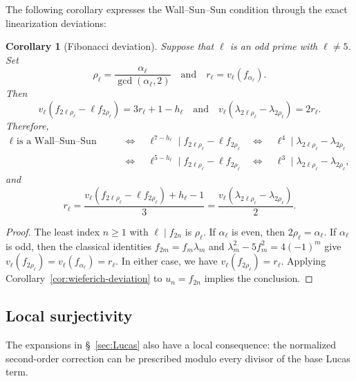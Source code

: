 \documentclass[12pt]{amsart}
\numberwithin{equation}{section}
\newtheorem{corollary}[theorem]{Corollary}
\theoremstyle{remark}
\theoremstyle{plain}
\begin{document}
The following corollary expresses the Wall--Sun--Sun condition through the exact linearization deviations:
\begin{corollary}[Fibonacci deviation]\label{cor:fib-deviation}
	Suppose that $\ell$ is an odd prime with $\ell\neq5$. Set
	\[
	\rho_\ell=\frac{\alpha_\ell}{\gcd(\alpha_\ell,2)}\quad\text{and}\quad r_\ell=v_\ell(f_{\alpha_\ell}).
	\]
	Then
	\[
	v_\ell\left(f_{2\ell\rho_\ell}-\ell f_{2\rho_\ell}\right)=3r_\ell+1-h_\ell\quad\text{and}\quad v_\ell\left(\lambda_{2\ell\rho_\ell}-\lambda_{2\rho_\ell}\right)=2r_\ell.
	\]
	Therefore,
	\[
	\begin{aligned}
		\ell\text{ is a Wall--Sun--Sun prime}\quad&\Longleftrightarrow\quad\ell^{7-h_\ell}\mid f_{2\ell\rho_\ell}-\ell f_{2\rho_\ell}\quad\Longleftrightarrow\quad \ell^4\mid\lambda_{2\ell\rho_\ell}-\lambda_{2\rho_\ell}\\
		&\Longleftrightarrow\quad\ell^{5-h_\ell}\mid f_{2\ell\rho_\ell}-\ell f_{2\rho_\ell}\quad\Longleftrightarrow\quad \ell^3\mid\lambda_{2\ell\rho_\ell}-\lambda_{2\rho_\ell},
	\end{aligned}
	\]
	and
	\[
	r_\ell=\frac{v_\ell(f_{2\ell\rho_\ell}-\ell f_{2\rho_\ell})+h_\ell-1}{3}=\frac{v_\ell(\lambda_{2\ell\rho_\ell}-\lambda_{2\rho_\ell})}{2}.
	\]
\end{corollary}
\begin{proof}
	The least index $n\ge1$ with $\ell\mid f_{2n}$ is $\rho_\ell$. If $\alpha_\ell$ is even, then $2\rho_\ell=\alpha_\ell$. If $\alpha_\ell$ is odd, then the classical identities $f_{2m}=f_{m}\lambda_{m}$ and $\lambda_m^2-5f_m^2=4(-1)^m$ give $v_\ell(f_{2\rho_\ell})=v_\ell(f_{\alpha_\ell})=r_\ell$. In either case, we have $v_\ell(f_{2\rho_\ell})=r_\ell$. Applying Corollary~\ref{cor:wieferich-deviation} to $u_n=f_{2n}$ implies the conclusion.
\end{proof}

\subsection{Local surjectivity}
The expansions in \S~\ref{sec:Lucas} also have a local consequence: the normalized second-order correction can be prescribed modulo every divisor of the base Lucas term.
\end{document}
